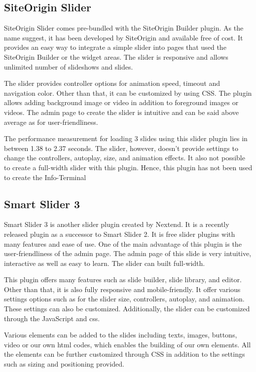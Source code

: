\subsection{SiteOrigin Slider}
SiteOrigin Slider comes pre-bundled with the SiteOrigin Builder plugin. As the name suggest, it has been developed by SiteOrigin and available free of cost. It provides an easy way to integrate a simple slider into pages that used the SiteOrigin Builder or the widget areas. The slider is responsive and allows unlimited number of slideshows and slides.

The slider provides controller options for animation speed, timeout and navigation color. Other than that, it can be customized by using CSS. The plugin allows adding background image or video in addition to foreground images or videos. The admin page to create the slider is intuitive and can be said above average as for user-friendliness.

The performance measurement for loading 3 slides using this slider plugin lies in between 1.38 to 2.37 seconds. The slider, however, doesn't provide settings to change the controllers, autoplay, size, and animation effects. It also not possible to create a full-width slider with this plugin. Hence, this plugin has not been used to create the Info-Terminal

\subsection{Smart Slider 3}
Smart Slider 3 is another slider plugin created by Nextend. It is a recently released plugin as a successor to Smart Slider 2. It is free slider plugins with many features and ease of use. One of the main advantage of this plugin is the user-friendliness of the admin page. The admin page of this slide is very intuitive, interactive as well as easy to learn. The slider can built full-width.

This plugin offers many features such as slide builder, slide library, and editor. Other than that, it is also fully responsive and mobile-friendly. It offer various settings options such as for the slider size, controllers, autoplay, and animation. These settings can also be customized. Additionally, the slider can be customized through the JavaScript and \ac{css}.

Various elements can be added to the slides including texts, images, buttons, video or our own \ac{html} codes, which enables the building of our own elements. All the elements can be further customized through CSS in addition to the settings such as sizing and positioning provided.

